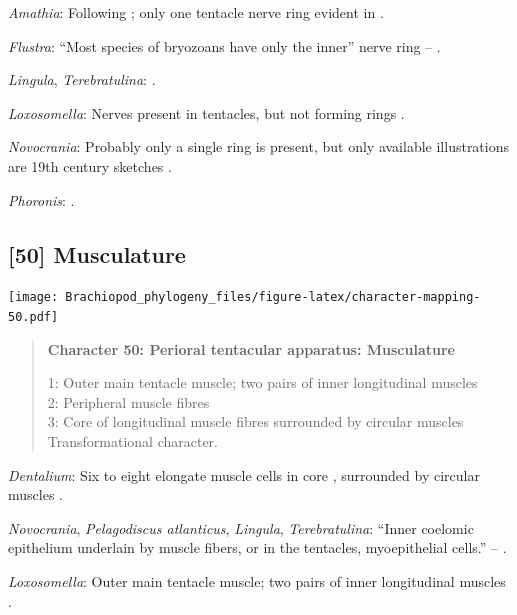 \documentclass[openany]{book}
\begin{document}
\hypertarget{Amathia-coding-49}{}
\emph{Amathia}: Following \citet{Temereva2017Innervationof}; only one
tentacle nerve ring evident in \citet{Temereva2016Thenervous}.

\hypertarget{Flustra-coding-49}{}
\emph{Flustra}: ``Most species of bryozoans have only the inner'' nerve
ring -- \citet{Temereva2017Innervationof}.

\hypertarget{Lingula-coding-49}{}
\emph{Lingula}, \emph{Terebratulina}: \citet{Temereva2017Innervationof}.

\hypertarget{Loxosomella-coding-49}{}
\emph{Loxosomella}: Nerves present in tentacles, but not forming rings
\citep{Fuchs2006}.

\hypertarget{Novocrania-coding-49}{}
\emph{Novocrania}: Probably only a single ring is present, but only
available illustrations are 19th century sketches \citep{Luter2016}.

\hypertarget{Phoronis-coding-49}{}
\emph{Phoronis}: \citet{Temereva2017Thefirst}.

\subsection*{{[}50{]} Musculature}\label{musculature}

\texttt{[image: Brachiopod\_phylogeny\_files/figure-latex/character-mapping-50.pdf]}

\begin{quote}
\textbf{Character 50: Perioral tentacular apparatus: Musculature}

1: Outer main tentacle muscle; two pairs of inner longitudinal muscles\\
2: Peripheral muscle fibres\\
3: Core of longitudinal muscle fibres surrounded by circular muscles\\
Transformational character.
\end{quote}

\hypertarget{Dentalium-coding-50}{}
\emph{Dentalium}: Six to eight elongate muscle cells in core
\citep{Shimek1988}, surrounded by circular muscles \citep{Byrum1994}.

\hypertarget{Lingula-coding-50}{}
\emph{Novocrania}, \emph{Pelagodiscus atlanticus}, \emph{Lingula},
\emph{Terebratulina}: ``Inner coelomic epithelium underlain by muscle
fibers, or in the tentacles, myoepithelial cells.'' --
\citet{Williams1997Introduction}.

\hypertarget{Loxosomella-coding-50}{}
\emph{Loxosomella}: Outer main tentacle muscle; two pairs of inner
longitudinal muscles \citep{Fuchs2006}.
\end{document}

